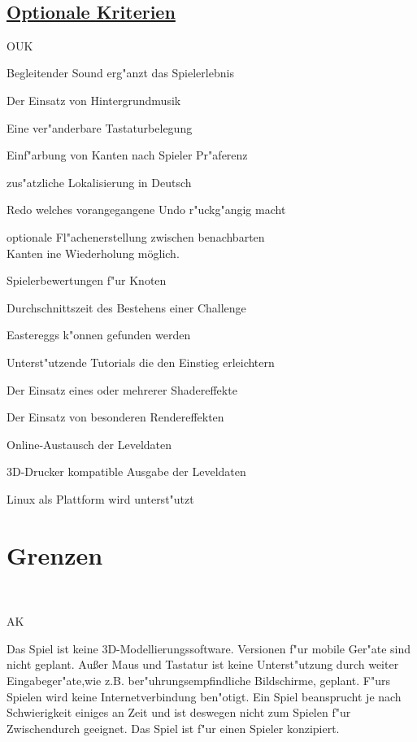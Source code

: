 ~\\


\subsection*{\underline{Optionale Kriterien}}

\begin{ids}{\gls{OUK}}


\id[10] Begleitender Sound erg{"a}nzt das Spielerlebnis

\id[20] Der Einsatz von Hintergrundmusik

\id[30] Eine ver{"a}nderbare Tastaturbelegung

\id[40] Einf{"a}rbung von Kanten nach Spieler Pr{"a}ferenz

\id[50] zus{"a}tzliche Lokalisierung in Deutsch

\id[60] Redo welches vorangegangene Undo r{"u}ckg{"a}ngig macht

\id[70] optionale Fl{"a}chenerstellung zwischen benachbarten \\Kanten
ine Wiederholung möglich.

\id[90] Spielerbewertungen f{"u}r Knoten

\id[100] Durchschnittszeit des Bestehens einer Challenge

\id[110] Eastereggs k{"o}nnen gefunden werden

\id[120] Unterst{"u}tzende Tutorials die den Einstieg erleichtern
	
\id[130] Der Einsatz eines oder mehrerer Shadereffekte

\id[140] Der Einsatz von besonderen Rendereffekten 

\id[150] Online-Austausch der Leveldaten

\id[160] 3D-Drucker kompatible Ausgabe der Leveldaten

\id[170] Linux als Plattform wird unterst{"u}tzt

\end{ids}


%
%
\clearpage


\section{Grenzen}
\label{UF:Grenzen}

~\\

\begin{ids}{\gls{AK}}

	
	\id[10] Das Spiel ist keine 3D-Modellierungssoftware.
	\id[20] Versionen f{"u}r mobile Ger{"a}te sind nicht geplant.
	\id[20] Außer Maus und Tastatur ist keine Unterst{"u}tzung durch weiter Eingabeger{"a}te,wie z.B.  ber{"u}hrungsempfindliche Bildschirme, geplant.
	\id[40]F{"u}rs Spielen wird keine Internetverbindung ben{"o}tigt. 
	\id[50] Ein Spiel beansprucht je nach Schwierigkeit einiges an Zeit und ist deswegen nicht zum Spielen f{"u}r Zwischendurch geeignet.
	\id[60] Das Spiel ist f{"u}r einen Spieler konzipiert.
	
\end{ids}


